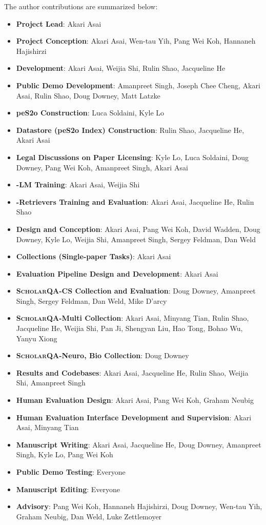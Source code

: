 The author contributions are summarized below:  
\begin{itemize}[itemsep=1.6pt,leftmargin=12pt,topsep=1.6pt]
    \item {\bf Project Lead}: Akari Asai
    \item {\bf Project Conception}: Akari Asai, Wen-tau Yih, Pang Wei Koh, Hannaneh Hajishirzi
    \item {\bf \model Development}: Akari Asai, Weijia Shi, Rulin Shao, Jacqueline He
    \item {\bf \model Public Demo Development}: Amanpreet Singh, Joseph Chee Cheng, Akari Asai, Rulin Shao, Doug Downey, Matt Latzke
    \item {\bf peS2o Construction}: Luca Soldaini, Kyle Lo
    \item {\bf Datastore (peS2o Index) Construction}: Rulin Shao, Jacqueline He, Akari Asai
    \item {\bf Legal Discussions on Paper Licensing}: Kyle Lo, Luca Soldaini, Doug Downey, Pang Wei Koh, Amanpreet Singh, Akari Asai
    \item {\bf \model-LM Training}: Akari Asai, Weijia Shi
    \item {\bf \model-Retrievers Training and Evaluation}: Akari Asai, Jacqueline He, Rulin Shao
    \item {\bf \data Design and Conception}: Akari Asai, Pang Wei Koh, David Wadden, Doug Downey, Kyle Lo, Weijia Shi, Amanpreet Singh, Sergey Feldman, Dan Weld
    \item {\bf \data Collections (Single-paper Tasks)}: Akari Asai
    \item {\bf \data Evaluation Pipeline Design and Development}: Akari Asai
    \item {\bf \textsc{ScholarQA}-CS Collection and Evaluation}: Doug Downey, Amanpreet Singh, Sergey Feldman, Dan Weld, Mike D’arcy
     \item {\bf \textsc{ScholarQA}-Multi Collection}: Akari Asai, Minyang Tian,  Rulin Shao, Jacqueline He, Weijia Shi, Pan Ji, Shengyan Liu, Hao Tong, Bohao Wu, Yanyu Xiong
    \item {\bf \textsc{ScholarQA}-Neuro, Bio Collection}: Doug Downey
    \item {\bf Results and Codebases}: Akari Asai, Jacqueline He, Rulin Shao, Weijia Shi, Amanpreet Singh
    \item {\bf Human Evaluation Design}: Akari Asai, Pang Wei Koh, Graham Neubig
    \item {\bf Human Evaluation Interface Development and Supervision}: Akari Asai, Minyang Tian
    \item {\bf Manuscript Writing}: Akari Asai, Jacqueline He, Doug Downey, Amanpreet Singh, Kyle Lo, Pang Wei Koh
    \item {\bf \model Public Demo Testing}: Everyone
    \item {\bf Manuscript Editing}: Everyone
    \item {\bf Advisory}: Pang Wei Koh, Hannaneh Hajishirzi, Doug Downey, Wen-tau Yih, Graham Neubig, Dan Weld, Luke Zettlemoyer 
\end{itemize}